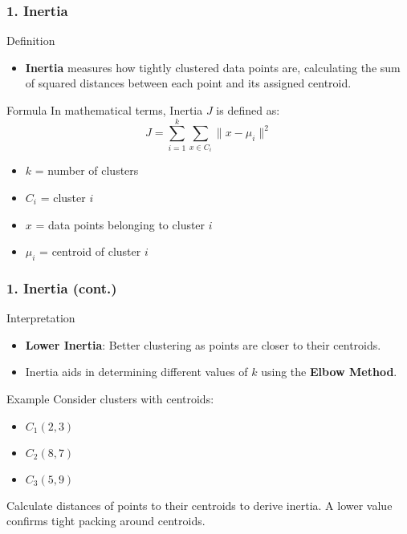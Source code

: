 \documentclass[aspectratio=169]{beamer}
\begin{document}
\begin{frame}[fragile]
    \frametitle{1. Inertia}
    \begin{block}{Definition}
        \begin{itemize}
            \item \textbf{Inertia} measures how tightly clustered data points are, calculating the sum of squared distances between each point and its assigned centroid.
        \end{itemize}
    \end{block}

    \begin{block}{Formula}
        In mathematical terms, Inertia \(J\) is defined as:
        \begin{equation}
        J = \sum_{i=1}^{k} \sum_{x \in C_i} \| x - \mu_i \|^2
        \end{equation}
        \begin{itemize}
            \item \(k\) = number of clusters
            \item \(C_i\) = cluster \(i\)
            \item \(x\) = data points belonging to cluster \(i\)
            \item \(\mu_i\) = centroid of cluster \(i\)
        \end{itemize}
    \end{block}
\end{frame}

\begin{frame}[fragile]
    \frametitle{1. Inertia (cont.)}
    \begin{block}{Interpretation}
        \begin{itemize}
            \item \textbf{Lower Inertia}: Better clustering as points are closer to their centroids.
            \item Inertia aids in determining different values of \(k\) using the \textbf{Elbow Method}.
        \end{itemize}
    \end{block}

    \begin{block}{Example}
        Consider clusters with centroids:
        \begin{itemize}
            \item \(C_1 (2, 3)\)
            \item \(C_2 (8, 7)\)
            \item \(C_3 (5, 9)\)
        \end{itemize}
        Calculate distances of points to their centroids to derive inertia. A lower value confirms tight packing around centroids.
    \end{block}
\end{frame}
\end{document}
